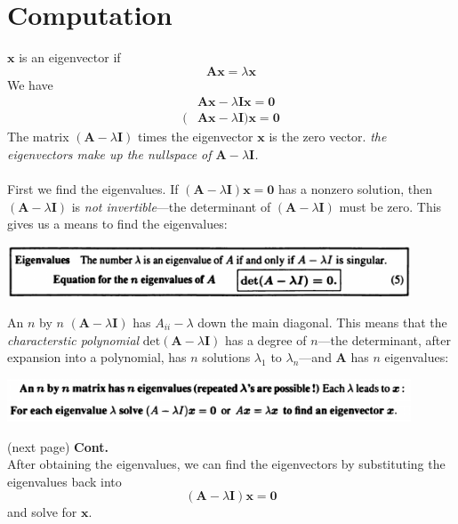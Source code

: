 \documentclass{report}
\begin{document}
\section{Computation}
$\bm x$ is an eigenvector if
\begin{equation*}
\bm{Ax}=\lambda\bm x
\end{equation*}
We have
\begin{align*}
&\bm{Ax}-\lambda\bm I\bm x=\bm 0\\
(&\bm{Ax}-\lambda\bm I)\bm x=\bm 0
\end{align*}
The matrix $(\bm A-\lambda\bm I)$ times the eigenvector $\bm x$ is the zero vector. \textit{the eigenvectors make up the nullspace of $\bm A-\lambda\bm I$.}\\
\vspace{1mm}\\
First we find the eigenvalues. If $(\bm{A}-\lambda\bm I)\bm x=\bm0$ has a nonzero solution, then $(\bm{A}-\lambda\bm I)$ is \textit{not invertible}---the determinant
of $(\bm{A}-\lambda\bm I)$ must be zero. This gives us a means to find the eigenvalues:
\begin{center}
\includegraphics[width=12cm]{110}
\end{center}
An $n$ by $n$ $(\bm{A}-\lambda\bm I)$ has $A_{ii}-\lambda$ down the main diagonal. This means that the \textit{characterstic polynomial} $\text{det}(\bm{A}-\lambda\bm I)$ 
has a degree of $n$---the determinant, after expansion into a polynomial, has $n$ solutions $\lambda_1$ to $\lambda_n$---and $\bm A$ has $n$ eigenvalues:
\begin{center}
\includegraphics[width=12cm]{111}
\end{center}
(next page)\newpage
\noindent\textbf{Cont.}\\
After obtaining the eigenvalues, we can find the eigenvectors by substituting the eigenvalues back into 
\begin{equation*}
(\bm{A}-\lambda\bm I)\bm x=\bm 0 
\end{equation*}
and solve for $\bm x$.\\
\vspace{1mm}\\
\end{document}
